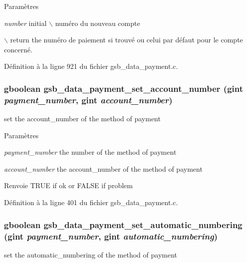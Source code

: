 \begin{DoxyParams}{Paramètres}
\item[{\em number}]initial $\backslash$ numéro du nouveau compte\end{DoxyParams}
$\backslash$ return the numéro de paiement si trouvé ou celui par défaut pour le compte concerné. 

Définition à la ligne 921 du fichier gsb\_\-data\_\-payment.c.

\subsubsection[{gsb\_\-data\_\-payment\_\-set\_\-account\_\-number}]{\setlength{\rightskip}{0pt plus 5cm}gboolean gsb\_\-data\_\-payment\_\-set\_\-account\_\-number (gint {\em payment\_\-number}, \/  gint {\em account\_\-number})}\label{gsb__data__payment_8c_a45b6ba45944aef62dbdc97f4b4142979}
set the account\_\-number of the method of payment


\begin{DoxyParams}{Paramètres}
\item[{\em payment\_\-number}]the number of the method of payment \item[{\em account\_\-number}]the account\_\-number of the method of payment\end{DoxyParams}
\begin{DoxyReturn}{Renvoie}
TRUE if ok or FALSE if problem 
\end{DoxyReturn}


Définition à la ligne 401 du fichier gsb\_\-data\_\-payment.c.

\subsubsection[{gsb\_\-data\_\-payment\_\-set\_\-automatic\_\-numbering}]{\setlength{\rightskip}{0pt plus 5cm}gboolean gsb\_\-data\_\-payment\_\-set\_\-automatic\_\-numbering (gint {\em payment\_\-number}, \/  gint {\em automatic\_\-numbering})}\label{gsb__data__payment_8c_aaba6a376380a3b99fa6b38400a245ecb}
set the automatic\_\-numbering of the method of payment


